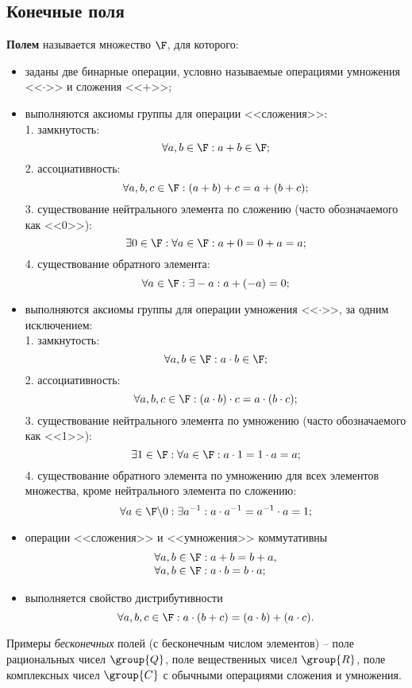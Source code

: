 \subsection{Конечные поля}

\textbf{Полем} называется множество $\F$, для которого:
\begin{itemize}
    \item заданы две бинарные операции, условно называемые операциями умножения <<$\cdot$>> и сложения <<$+$>>;
    \item выполняются аксиомы группы для операции <<сложения>>: \\
        1. замкнутость:
		\[\forall a, b \in \F: a + b \in \F;\]
        2. ассоциативность:
		\[\forall a, b, c \in \F: (a+b)+c = a+(b+c);\]
        3. существование нейтрального элемента по сложению (часто обозначаемого как <<0>>):
		\[\exists 0 \in \F: \forall a \in \F: a + 0 = 0 + a = a; \]
        4. существование обратного элемента:
		\[\forall a \in \F: \exists -a: a + (-a) = 0; \]
    \item выполняются аксиомы группы для операции умножения <<$\cdot$>>, за одним исключением: \\
        1. замкнутость:
		\[\forall a, b \in \F: a \cdot b \in \F; \]
        2. ассоциативность:
		\[\forall a, b, c \in \F: (a \cdot b) \cdot c = a \cdot (b \cdot c);\]
        3. существование нейтрального элемента по умножению (часто обозначаемого как <<1>>):
		\[\exists 1 \in \F: \forall a \in \F: a \cdot 1 = 1 \cdot a = a;\]
        4. существование обратного элемента по умножению для всех элементов множества, кроме нейтрального элемента по сложению:
		\[\forall a \in {\F \backslash 0}: \exists a^{-1}: a \cdot a^{-1} = a^{-1} \cdot a = 1;\]
    \item операции <<сложения>> и <<умножения>> коммутативны
        \[ \begin{array}{l}
            \forall a, b \in \F: a + b = b + a, \\
            \forall a, b \in \F: a \cdot b = b \cdot a; \\
        \end{array} \]
    \item выполняется свойство дистрибутивности
        \[ \forall a, b, c \in \F: a \cdot (b + c) = (a \cdot b) + (a \cdot c). \]
\end{itemize}

Примеры \emph{бесконечных} полей (с бесконечным числом элементов) -- поле рациональных чисел $\group{Q}$, поле вещественных чисел $\group{R}$, поле комплексных чисел $\group{C}$ с обычными операциями сложения и умножения.

